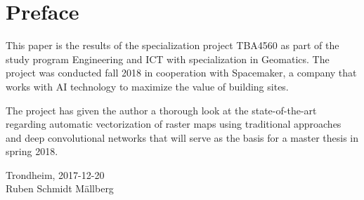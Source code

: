 \section*{Preface}
This paper is the results of the specialization project TBA4560 as part of the study program Engineering and ICT with specialization in Geomatics. The project was conducted fall 2018 in cooperation with Spacemaker, a company that works with AI technology to maximize the value of building sites. 

The project has given the author a thorough look at the state-of-the-art regarding automatic vectorization of raster maps using traditional approaches and deep convolutional networks that will serve as the basis for a master thesis in spring 2018.

\begin{center}
Trondheim, 2017-12-20\\[1pc]
Ruben Schmidt Mällberg
\end{center}